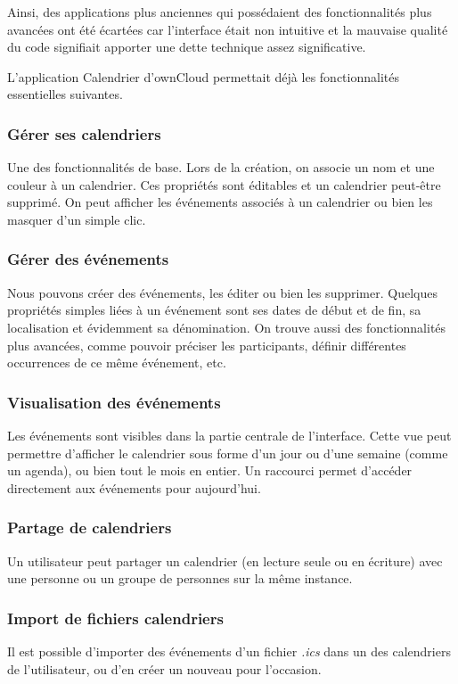 \documentclass[10pt,a4paper, twoside]{report}
\begin{document}
	Ainsi, des applications plus anciennes qui possédaient des fonctionnalités plus avancées ont été écartées car l'interface était non intuitive et la mauvaise qualité du code signifiait apporter une dette technique assez significative.
	
	L'application Calendrier d'ownCloud permettait déjà les fonctionnalités essentielles suivantes.
	
	\subsubsection{Gérer ses calendriers}
	Une des fonctionnalités de base. Lors de la création, on associe un nom et une couleur à un calendrier. Ces propriétés sont éditables et un calendrier peut-être supprimé. On peut afficher les événements associés à un calendrier ou bien les masquer d'un simple clic.
	
	\subsubsection{Gérer des événements}
	Nous pouvons créer des événements, les éditer ou bien les supprimer. Quelques propriétés simples liées à un événement sont ses dates de début et de fin, sa localisation et évidemment sa dénomination. On trouve aussi des fonctionnalités plus avancées, comme pouvoir préciser les participants, définir différentes occurrences de ce même événement, etc.
	
	\subsubsection{Visualisation des événements}
	Les événements sont visibles dans la partie centrale de l'interface. Cette vue peut permettre d'afficher le calendrier sous forme d'un jour ou d'une semaine (comme un agenda), ou bien tout le mois en entier. Un raccourci permet d'accéder directement aux événements pour aujourd’hui.
	
	\subsubsection{Partage de calendriers}
	Un utilisateur peut partager un calendrier (en lecture seule ou en écriture) avec une personne ou un groupe de personnes sur la même instance.
	
	\subsubsection{Import de fichiers calendriers}
	Il est possible d'importer des événements d'un fichier \textit{.ics} dans un des calendriers de l'utilisateur, ou d'en créer un nouveau pour l'occasion.
	
\end{document}
